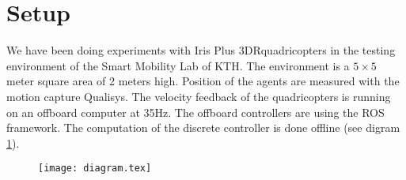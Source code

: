 \section{Setup}
We have been doing experiments with Iris Plus 3DR\trademark quadricopters in the testing environment of the Smart Mobility Lab of KTH.
The environment is a $5\times5$ meter square area of 2 meters high.
Position of the agents are measured with the motion capture Qualisys\trademark.
The velocity feedback of the quadricopters is running on an offboard computer at 35Hz. The offboard controllers are using the ROS framework.
The computation of the discrete controller is done offline (see digram \ref{diagram}).

\begin{figure}
\texttt{[image: diagram.tex]}
\label{diagram}
\end{figure}